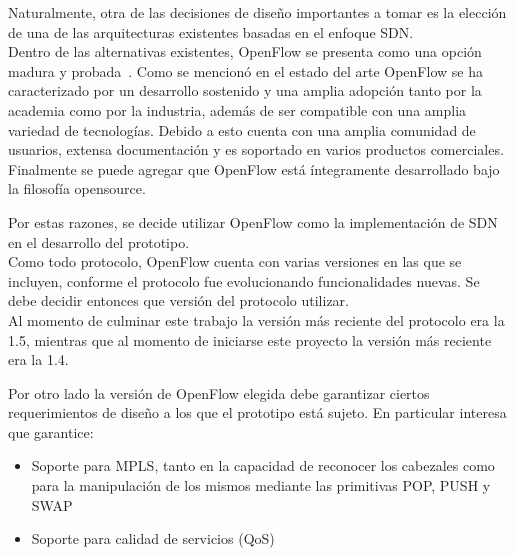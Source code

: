 Naturalmente, otra de las decisiones de dise\~no importantes a tomar es la elecci\'on de una de las arquitecturas existentes basadas en el enfoque SDN.\\
  
Dentro de las alternativas existentes, OpenFlow se presenta como una opci\'on madura y probada~\citep{Ofelia}. Como se mencion\'o en el estado del arte OpenFlow  se ha caracterizado por un desarrollo sostenido y una amplia adopci\'on tanto por la academia como por la industria, adem\'as de ser compatible con una amplia variedad de tecnolog\'ias. Debido a esto cuenta con una amplia comunidad de usuarios, extensa documentaci\'on y es soportado en varios productos comerciales\citep{Pica8}\citep{HP}\citep{Centec}\citep{SDNProductlist}. Finalmente se puede agregar que OpenFlow est\'a íntegramente desarrollado bajo la filosof\'ia opensource. 

Por estas razones, se decide utilizar OpenFlow como la implementaci\'on de SDN en el desarrollo del prototipo.\\






Como todo protocolo, OpenFlow cuenta con varias versiones en las que se incluyen, conforme el protocolo fue evolucionando funcionalidades nuevas. Se debe decidir entonces que versi\'on del protocolo utilizar.\\

Al momento de culminar este trabajo la versi\'on m\'as reciente del protocolo era la 1.5, mientras que al momento de iniciarse este proyecto la versi\'on m\'as reciente era la 1.4. 

Por otro lado la versi\'on de OpenFlow elegida debe garantizar ciertos requerimientos de dise\~no a los que el prototipo est\'a sujeto. En particular interesa que garantice:

\begin{itemize}
\item Soporte para MPLS, tanto en la capacidad de reconocer los cabezales como para la manipulaci\'on de los mismos mediante las primitivas POP, PUSH y SWAP
\item Soporte para calidad de servicios (QoS)
\end{itemize}

